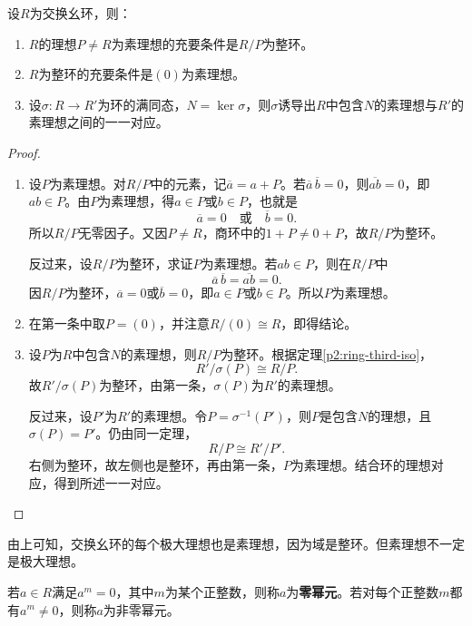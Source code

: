 \begin{theorem}\label{p2:prime-domain}
设$R$为交换幺环，则：
\begin{enumerate}
\item $R$的理想$P\ne R$为素理想的充要条件是$R/P$为整环。
\item $R$为整环的充要条件是$(0)$为素理想。
\item 设$\sigma:R\to R'$为环的满同态，$N=\ker\sigma$，则$\sigma$诱导出$R$中包含$N$的素理想与$R'$的素理想之间的一一对应。
\end{enumerate}
\end{theorem}
\begin{proof}
	\begin{enumerate}
		\item 设$P$为素理想。对$R/P$中的元素，记$\overline a=a+P$。若$\overline a\,\overline b=0$，则$\overline{ab}=0$，即$ab\in P$。由$P$为素理想，得$a\in P$或$b\in P$，也就是
		\[
		\overline a=0\quad\text{或}\quad\overline b=0.
		\]
		所以$R/P$无零因子。又因$P\ne R$，商环中的$1+P\ne0+P$，故$R/P$为整环。
		
		反过来，设$R/P$为整环，求证$P$为素理想。若$ab\in P$，则在$R/P$中
		\[
		\overline a\,\overline b=\overline{ab}=0.
		\]
		因$R/P$为整环，$\overline a=0$或$\overline b=0$，即$a\in P$或$b\in P$。所以$P$为素理想。
		\item 在第一条中取$P=(0)$，并注意$R/(0)\cong R$，即得结论。
		\item 设$P$为$R$中包含$N$的素理想，则$R/P$为整环。根据定理\ref{p2:ring-third-iso}，
		\[
		R'/\sigma(P)\cong R/P.
		\]
		故$R'/\sigma(P)$为整环，由第一条，$\sigma(P)$为$R'$的素理想。
		
		反过来，设$P'$为$R'$的素理想。令$P=\sigma^{-1}(P')$，则$P$是包含$N$的理想，且$\sigma(P)=P'$。仍由同一定理，
		\[
		R/P\cong R'/P'.
		\]
		右侧为整环，故左侧也是整环，再由第一条，$P$为素理想。结合环的理想对应，得到所述一一对应。
	\end{enumerate}
\end{proof}

由上可知，交换幺环的每个极大理想也是素理想，因为域是整环。但素理想不一定是极大理想。

\begin{definition}
若$a\in R$满足$a^m=0$，其中$m$为某个正整数，则称$a$为\textbf{零幂元}。若对每个正整数$m$都有$a^m\ne0$，则称$a$为非零幂元。
\end{definition}


